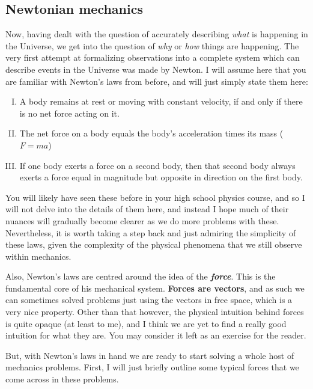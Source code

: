 \documentclass{article}
\begin{document}

\subsection{Newtonian mechanics}
Now, having dealt with the question of accurately describing \textit{what} is happening in the Universe, we get into the question of \textit{why} or \textit{how} things are happening. The very first attempt at formalizing observations into a complete system which can describe events in the Universe was made by Newton. I will assume here that you are familiar with Newton's laws from before, and will just simply state them here:

\begin{enumerate}[I.]
    \item A body remains at rest or moving with constant velocity, if and only if there is no net force acting on it.
    \item The net force on a body equals the body's acceleration times its mass ($F=ma$)
    \item If one body exerts a force on a second body, then that second body always exerts a force equal in magnitude but opposite in direction on the first body. 
\end{enumerate}

You will likely have seen these before in your high school physics course, and so I will not delve into the details of them here, and instead I hope much of their nuances will gradually become clearer as we do more problems with these. Nevertheless, it is worth taking a step back and just admiring the simplicity of these laws, given the complexity of the physical phenomena that we still observe within mechanics.

Also, Newton's laws are centred around the idea of the \textit{\textbf{force}}. This is the fundamental core of his mechanical system. \textbf{Forces are vectors}, and as such we can sometimes solved problems just using the vectors in free space, which is a very nice property. Other than that however, the physical intuition behind forces is  quite opaque (at least to me), and I think we are yet to find a really good intuition for what they are. You may consider it left as an exercise for the reader.

But, with Newton's laws in hand we are ready to start solving a whole host of mechanics problems. First, I will just briefly outline some typical forces that we come across in these problems.
\end{document}
